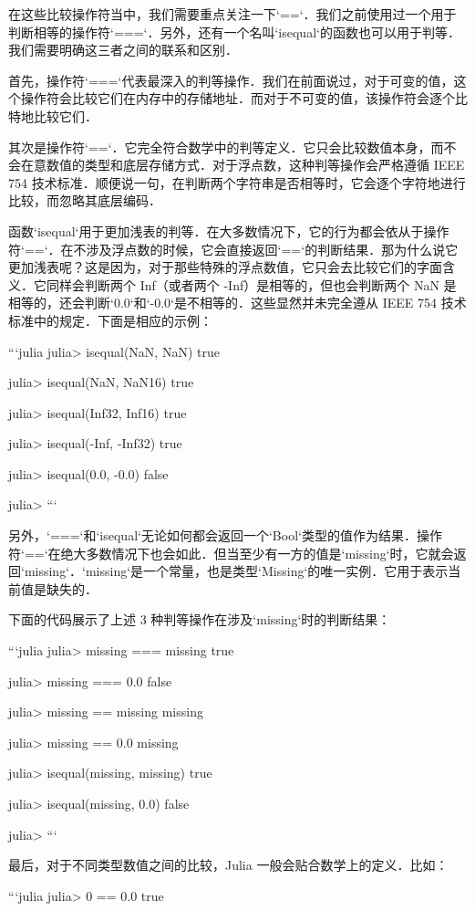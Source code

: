 在这些比较操作符当中，我们需要重点关注一下`==`．我们之前使用过一个用于判断相等的操作符`===`．另外，还有一个名叫`isequal`的函数也可以用于判等．我们需要明确这三者之间的联系和区别．

首先，操作符`===`代表最深入的判等操作．我们在前面说过，对于可变的值，这个操作符会比较它们在内存中的存储地址．而对于不可变的值，该操作符会逐个比特地比较它们．

其次是操作符`==`．它完全符合数学中的判等定义．它只会比较数值本身，而不会在意数值的类型和底层存储方式．对于浮点数，这种判等操作会严格遵循 IEEE 754 技术标准．顺便说一句，在判断两个字符串是否相等时，它会逐个字符地进行比较，而忽略其底层编码．

函数`isequal`用于更加浅表的判等．在大多数情况下，它的行为都会依从于操作符`==`．在不涉及浮点数的时候，它会直接返回`==`的判断结果．那为什么说它更加浅表呢？这是因为，对于那些特殊的浮点数值，它只会去比较它们的字面含义．它同样会判断两个 Inf（或者两个 -Inf）是相等的，但也会判断两个 NaN 是相等的，还会判断`0.0`和`-0.0`是不相等的．这些显然并未完全遵从 IEEE 754 技术标准中的规定．下面是相应的示例：

```julia
julia> isequal(NaN, NaN)
true

julia> isequal(NaN, NaN16)
true

julia> isequal(Inf32, Inf16)
true

julia> isequal(-Inf, -Inf32)
true

julia> isequal(0.0, -0.0)
false

julia> 
```

另外，`===`和`isequal`无论如何都会返回一个`Bool`类型的值作为结果．操作符`==`在绝大多数情况下也会如此．但当至少有一方的值是`missing`时，它就会返回`missing`．`missing`是一个常量，也是类型`Missing`的唯一实例．它用于表示当前值是缺失的．

下面的代码展示了上述 3 种判等操作在涉及`missing`时的判断结果：

```julia
julia> missing === missing
true

julia> missing === 0.0
false

julia> missing == missing
missing

julia> missing == 0.0
missing

julia> isequal(missing, missing)
true

julia> isequal(missing, 0.0)
false

julia> 
```

最后，对于不同类型数值之间的比较，Julia 一般会贴合数学上的定义．比如：

```julia
julia> 0 == 0.0
true

